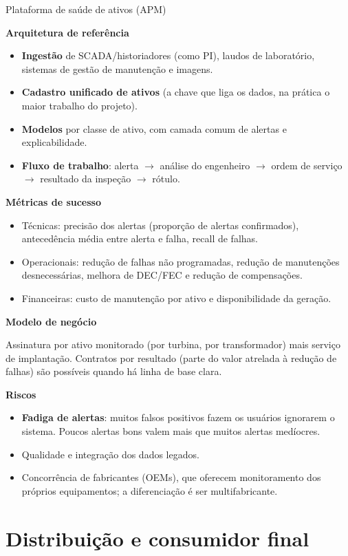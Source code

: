 \documentclass[11pt,a4paper]{article}
\newcommand{\prodsec}[1]{\par\medskip\noindent\textbf{\color{prodcolor}#1}\par\smallskip}
\begin{document}
\begin{produto}{Plataforma de saúde de ativos (APM)}
\prodsec{Arquitetura de referência}
\begin{itemize}
  \item \textbf{Ingestão} de SCADA/historiadores (como PI), laudos de
    laboratório, sistemas de gestão de manutenção e imagens.
  \item \textbf{Cadastro unificado de ativos} (a chave que liga os dados, na
    prática o maior trabalho do projeto).
  \item \textbf{Modelos} por classe de ativo, com camada comum de alertas e
    explicabilidade.
  \item \textbf{Fluxo de trabalho}: alerta $\rightarrow$ análise do engenheiro
    $\rightarrow$ ordem de serviço $\rightarrow$ resultado da inspeção
    $\rightarrow$ rótulo.
\end{itemize}

\prodsec{Métricas de sucesso}
\begin{itemize}
  \item Técnicas: precisão dos alertas (proporção de alertas confirmados),
    antecedência média entre alerta e falha, recall de falhas.
  \item Operacionais: redução de falhas não programadas, redução de
    manutenções desnecessárias, melhora de DEC/FEC e redução de compensações.
  \item Financeiras: custo de manutenção por ativo e disponibilidade da
    geração.
\end{itemize}

\prodsec{Modelo de negócio}
Assinatura por ativo monitorado (por turbina, por transformador) mais serviço
de implantação. Contratos por resultado (parte do valor atrelada à redução de
falhas) são possíveis quando há linha de base clara.

\prodsec{Riscos}
\begin{itemize}
  \item \textbf{Fadiga de alertas}: muitos falsos positivos fazem os usuários
    ignorarem o sistema. Poucos alertas bons valem mais que muitos alertas
    medíocres.
  \item Qualidade e integração dos dados legados.
  \item Concorrência de fabricantes (OEMs), que oferecem monitoramento dos
    próprios equipamentos; a diferenciação é ser multifabricante.
\end{itemize}
\end{produto}

\section{Distribuição e consumidor final}
\end{document}

